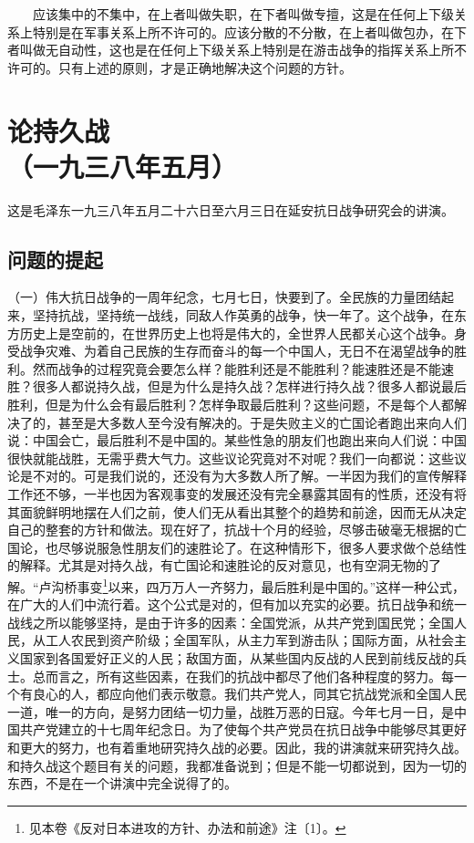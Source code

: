 \documentclass[cn,11pt,chinese]{elegantbook}
\def\myformat#1{\hfil\hfil #1}
\begin{document}
　　应该集中的不集中，在上者叫做失职，在下者叫做专擅，这是在任何上下级关系上特别是在军事关系上所不许可的。应该分散的不分散，在上者叫做包办，在下者叫做无自动性，这也是在任何上下级关系上特别是在游击战争的指挥关系上所不许可的。只有上述的原则，才是正确地解决这个问题的方针。\\
\newpage\section*{\myformat{论持久战}\\\myformat{（一九三八年五月）}}
\begin{introduction}\item  这是毛泽东一九三八年五月二十六日至六月三日在延安抗日战争研究会的讲演。\end{introduction}
\subsection*{\myformat{问题的提起}}
（一）伟大抗日战争的一周年纪念，七月七日，快要到了。全民族的力量团结起来，坚持抗战，坚持统一战线，同敌人作英勇的战争，快一年了。这个战争，在东方历史上是空前的，在世界历史上也将是伟大的，全世界人民都关心这个战争。身受战争灾难、为着自己民族的生存而奋斗的每一个中国人，无日不在渴望战争的胜利。然而战争的过程究竟会要怎么样？能胜利还是不能胜利？能速胜还是不能速胜？很多人都说持久战，但是为什么是持久战？怎样进行持久战？很多人都说最后胜利，但是为什么会有最后胜利？怎样争取最后胜利？这些问题，不是每个人都解决了的，甚至是大多数人至今没有解决的。于是失败主义的亡国论者跑出来向人们说：中国会亡，最后胜利不是中国的。某些性急的朋友们也跑出来向人们说：中国很快就能战胜，无需乎费大气力。这些议论究竟对不对呢？我们一向都说：这些议论是不对的。可是我们说的，还没有为大多数人所了解。一半因为我们的宣传解释工作还不够，一半也因为客观事变的发展还没有完全暴露其固有的性质，还没有将其面貌鲜明地摆在人们之前，使人们无从看出其整个的趋势和前途，因而无从决定自己的整套的方针和做法。现在好了，抗战十个月的经验，尽够击破毫无根据的亡国论，也尽够说服急性朋友们的速胜论了。在这种情形下，很多人要求做个总结性的解释。尤其是对持久战，有亡国论和速胜论的反对意见，也有空洞无物的了解。“卢沟桥事变\footnote[1]{ 见本卷《反对日本进攻的方针、办法和前途》注〔1〕。}以来，四万万人一齐努力，最后胜利是中国的。”这样一种公式，在广大的人们中流行着。这个公式是对的，但有加以充实的必要。抗日战争和统一战线之所以能够坚持，是由于许多的因素：全国党派，从共产党到国民党；全国人民，从工人农民到资产阶级；全国军队，从主力军到游击队；国际方面，从社会主义国家到各国爱好正义的人民；敌国方面，从某些国内反战的人民到前线反战的兵士。总而言之，所有这些因素，在我们的抗战中都尽了他们各种程度的努力。每一个有良心的人，都应向他们表示敬意。我们共产党人，同其它抗战党派和全国人民一道，唯一的方向，是努力团结一切力量，战胜万恶的日寇。今年七月一日，是中国共产党建立的十七周年纪念日。为了使每个共产党员在抗日战争中能够尽其更好和更大的努力，也有着重地研究持久战的必要。因此，我的讲演就来研究持久战。和持久战这个题目有关的问题，我都准备说到；但是不能一切都说到，因为一切的东西，不是在一个讲演中完全说得了的。\\
\end{document}
